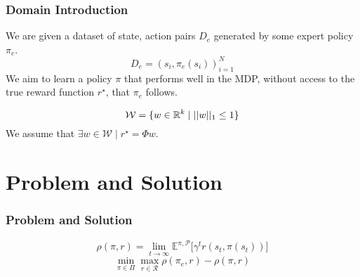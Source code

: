 \documentclass{beamer}
\begin{document}
\begin{frame}
	\frametitle{Domain Introduction}

	We are given a dataset of state, action pairs $D_e$ generated by some expert policy $\pi_e$.
	\[ D_e = (s_i, \pi_e(s_i))_{i=1}^N \]
	We aim to learn a policy $\pi$ that performs well in the MDP, without access to the true reward function $r^\star$,
	that $\pi_e$ follows.

	\[ \mathcal{W} = \lbrace w \in \mathbb{R}^k \mid \lvert \lvert w \rvert \rvert_1 \leq 1 \rbrace \]
	We assume that $\exists w \in \mathcal{W} \mid r^\star = \Phi w$.

\end{frame}

\section*{Problem and Solution}

\begin{frame}
	\frametitle{Problem and Solution}
	\[ \rho(\pi, r) = \lim_{t \to \infty} \mathbb{E}^{\pi, \mathcal{P}} \lbrack \gamma^t r(s_t, \pi(s_t)) \rbrack \]
	\[ \min_{\pi \in \Pi} \max_{r \in \mathcal{R}} \rho(\pi_e, r) - \rho(\pi, r)\]
\end{frame}
\end{document}
